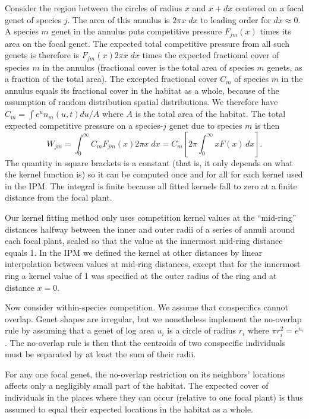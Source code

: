 \documentclass[11pt]{article}
\begin{document}
Consider the region between the circles of radius $x$ and $x+dx$ centered on a focal genet of species $j$. The area of this annulus
is $2 \pi x \; dx$  to leading order for $dx \approx 0$. A species $m$ genet 
in the annulus puts competitive pressure $F_{jm}(x)$ times its area on
the focal genet. The expected total competitive pressure from all such genets 
is therefore is $F_{jm}(x) 2 \pi x \; dx$ times the expected fractional cover of species $m$ in the annulus 
(fractional cover is the total area of species $m$ genets, as a fraction of the total area). The excepted fractional cover $C_m$ of species $m$
in the annulus equals its fractional cover in the habitat as a whole, because of the assumption of random distribution
spatial distributions. We therefore have $C_m  = \int e^u n_m(u,t) du/A$ where $A$ is the total area of the habitat. 
The total expected competitive pressure on a species-$j$ genet due to species $m$ is then 
\begin{equation}
W_{jm} = \int_0^\infty{C_m F_{jm}(x) 2 \pi x \; dx}  = C_m \left [2 \pi \int_0^{\infty} x F(x) \, dx \right ].
\label{eqn:wbarm}
\end{equation} 
The quantity in square brackets is a constant (that is, it only depends on what the kernel function
is) so it can be computed once and for all for each kernel used in the IPM. The integral is finite because
all fitted kernels fall to zero at a finite distance from the focal plant. 

Our kernel fitting method only uses competition kernel values at the ``mid-ring'' distances
halfway between the inner and outer radii of a series of annuli around each focal
plant, scaled so that the value at the innermost mid-ring distance equals 1. 
In the IPM we defined the kernel at other distances by linear interpolation between values at 
mid-ring distances, except that for the innermost ring a kernel value of 1 was specified at the
outer radius of the ring and at distance $x=0$. 

Now consider within-species competition. We assume that conspecifics cannot overlap. Genet shapes are irregular, but we 
nonetheless implement the no-overlap rule by assuming that a genet of log area $u_i$ is a 
circle of radius $r_i$ where $\pi r_i^2 = e^{u_i}$. The no-overlap rule is then that the centroids of two conspecific individuals 
must be separated by at least the sum of their radii. 

For any one focal genet, the no-overlap restriction on its neighbors' locations affects 
only a negligibly small part of the habitat. The expected cover of individuals in the places
where they can occur (relative to one focal plant) is thus assumed to equal their expected locations
in the habitat as a whole. 
 
\end{document}
